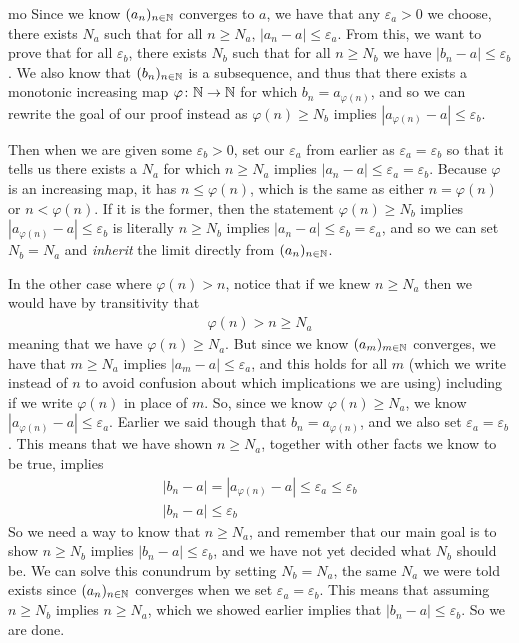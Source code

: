 \documentclass[11pt]{article}
\begin{document}
\begin{my proof}{mo}
Since we know $(a_n)_{n\in \mathbb{N}}$ converges to $a$, we have that any $\varepsilon_a > 0$ we choose, there exists $N_a$ such that for all $n \ge N_a$, $|a_n - a| \le \varepsilon_a$. From this, we want to prove that for all $\varepsilon_b$, there exists $N_b$ such that for all $n \ge N_b$ we have $|b_n - a| \le \varepsilon_b$. We also know that $(b_n)_{n\in \mathbb{N}}$ is a subsequence, and thus that there exists a monotonic increasing map $\varphi\colon \mathbb{N} \to \mathbb{N}$ for which $b_n = a_{\varphi(n)}$, and so we can rewrite the goal of our proof instead as $\varphi(n) \ge N_b$ implies $|a_{\varphi(n)} - a| \le \varepsilon_b$.

Then when we are given some $\varepsilon_b > 0$, set our $\varepsilon_a$ from earlier as $\varepsilon_a = \varepsilon_b$ so that it tells us there exists a $N_a$ for which $n \ge N_a$ implies $|a_n - a| \le \varepsilon_a = \varepsilon_b$. Because $\varphi$ is an increasing map, it has $n \le \varphi(n)$, which is the same as either $n = \varphi(n)$ or $n < \varphi(n)$. If it is the former, then the statement $\varphi(n) \ge N_b$ implies $|a_{\varphi(n)} - a| \le \varepsilon_b$ is literally $n \ge N_b$ implies $|a_n - a| \le \varepsilon_b = \varepsilon_a$, and so we can set $N_b = N_a$ and \emph{inherit} the limit directly from $(a_n)_{n\in \mathbb{N}}$.

In the other case where $\varphi(n) > n$, notice that if we knew $n \ge N_a$ then we would have by transitivity that \begin{gather*}
\varphi(n) > n \ge N_a
\end{gather*}
meaning that we have $\varphi(n) \ge N_a$. But since we know $(a_m)_{m\in \mathbb{N}}$ converges, we have that $m \ge N_a$ implies $|a_m - a| \le \varepsilon_a$, and this holds for all $m$ (which we write instead of $n$ to avoid confusion about which implications we are using) including if we write $\varphi(n)$ in place of $m$. So, since we know $\varphi(n) \ge N_a$, we know $|a_{\varphi(n)} - a| \le \varepsilon_a$. Earlier we said though that $b_n = a_{\varphi(n)}$, and we also set $\varepsilon_a =\varepsilon_b$. This means that we have shown $n \ge N_a$, together with other facts we know to be true, implies \begin{gather*}
|b_n - a| = |a_{\varphi(n)} - a| \le \varepsilon_a \le \varepsilon_b \\
|b_n - a| \le \varepsilon_b
\end{gather*}
So we need a way to know that $n \ge N_a$, and remember that our main goal is to show $n \ge N_b$ implies $|b_n - a| \le \varepsilon_b$, and we have not yet decided what $N_b$ should be. We can solve this conundrum by setting $N_b = N_a$, the same $N_a$ we were told exists since $(a_n)_{n\in \mathbb{N}}$ converges when we set $\varepsilon_a = \varepsilon_b$. This means that assuming $n \ge N_b$ implies $n \ge N_a$, which we showed earlier implies that $|b_n - a| \le \varepsilon_b$. So we are done.
\end{my proof}
\end{document}
